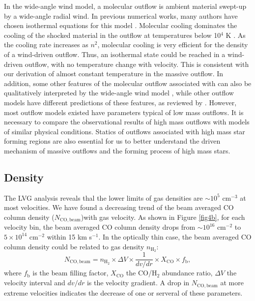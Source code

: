 In the wide-angle wind model, a molecular outflow is ambient material swept-up by a wide-angle radial wind. In previous numerical works, many authors have chosen isothermal equations for this model \citep{1996ApJ...472..211L,2001ApJ...557..429L}. Molecular cooling dominates the cooling of the shocked material in the outflow at temperatures below 10$^4$ K \citep{1997IAUS..182..181H}. As the cooling rate increases as $n^2$, molecular cooling is very efficient for the density of a wind-driven outflow. Thus, an isothermal state could be reached in a wind-driven outflow, with no temperature change with velocity. This is consistent with our derivation of almost constant temperature in the massive  outflow. In addition, some other features of the molecular outflow associated with  can also be qualitatively interpreted by the wide-angle wind model \citep{2009ApJ...696...66Q}, while other outflow models have different predictions of these features, as reviewed by \citet{2007prpl.conf..245A}. However, most outflow models existed have parameters typical of low mass outflows. It is necessary to compare the observational results of high mass outflows with models of similar physical conditions. Statics of outflows associated with high mass star forming regions are also essential for us to better understand the driven mechanism of massive outflows and the forming process of high mass stars.

\subsection{Density}

The LVG analysis reveals thal the lower limits of gas densities are $\sim 10^5$ cm$^{-3}$ at most velocities. We have found a decreasing trend of the beam averaged CO column density ($N_{\mathrm{CO,beam}}$)with gas velocity. As shown in Figure \ref{fig4b}, for each velocity bin, the beam averaged CO column density drops from $\sim 10^{16} $ cm$^{-2}$ to $5 \times 10^{14}$ cm$^{-2}$ within 15 km s$^{-1}$. In the optically thin case, the beam averaged CO column density could be related to gas density $n_{\mathrm{H}_2}$: 
\begin{equation}
N_{\mathrm{CO,beam}} = n_{\mathrm{H}_2} \times \Delta V \times \frac{1}{dv/dr} \times X_{\mathrm{CO}} \times f_{\mathrm{b}}, 
\end{equation}
where $f_{\mathrm{b}}$ is the beam filling factor, $X_{\mathrm{CO}}$ the CO/H$_2$ abundance ratio, $\Delta V$ the velocity interval and $dv/dr$ is the velocity gradient. A drop in $N_{\mathrm{CO,beam}}$ at more extreme velocities indicates the decrease of one or serveral of these parameters. 

